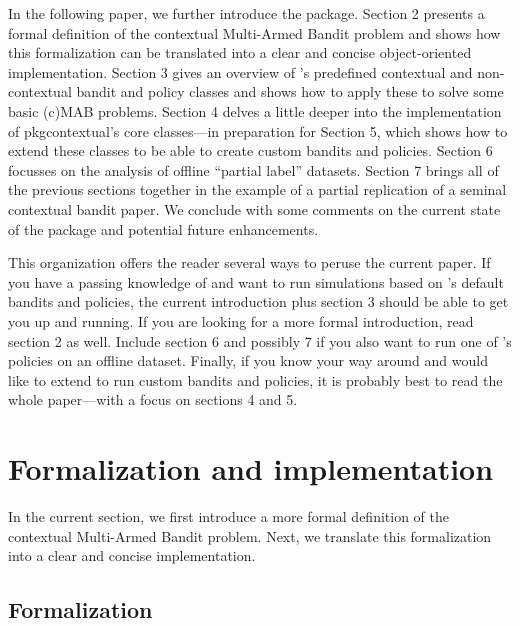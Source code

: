 \documentclass{jss}\usepackage[]{graphicx}\usepackage[]{color}
\begin{document}
In the following paper, we further introduce the  package. Section 2 presents a formal definition of the contextual Multi-Armed Bandit problem and shows how this formalization can be translated into a clear and concise object-oriented implementation. Section 3 gives an overview of 's predefined contextual and non-contextual bandit and policy classes and shows how to apply these to solve some basic (c)MAB problems. Section 4 delves a little deeper into the implementation of pkg{contextual}'s core classes---in preparation for Section 5, which shows how to extend these classes to be able to create custom bandits and policies. Section 6 focusses on the analysis of offline \textquotedblleft{}partial label\textquotedblright{} datasets. Section 7 brings all of the previous sections together in the example of a partial replication of a seminal contextual bandit paper. We conclude with some comments on the current state of the package and potential future enhancements.

This organization offers the reader several ways to peruse the current paper. If you have a passing knowledge of  and want to run simulations based on 's default bandits and policies, the current introduction plus section 3 should be able to get you up and running. If you are looking for a more formal introduction, read section 2 as well. Include section 6 and possibly 7 if you also want to run one of 's policies on an offline dataset. Finally, if you know your way around  and would like to extend  to run custom bandits and policies, it is probably best to read the whole paper---with a focus on sections 4 and 5.

\section{Formalization and implementation}

In the current section, we first introduce a more formal definition of the contextual Multi-Armed Bandit problem. Next, we translate this formalization into a clear and concise implementation.

\subsection{Formalization}
\end{document}
